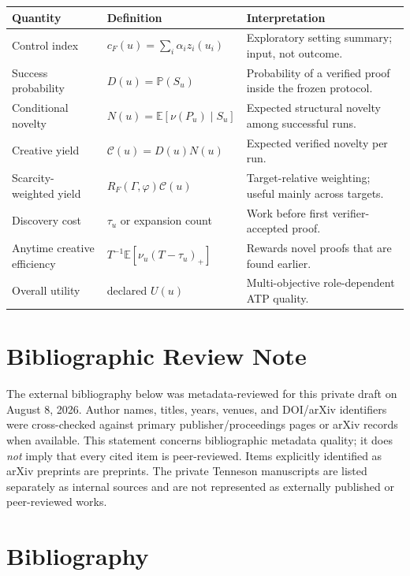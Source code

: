 \documentclass[11pt]{article}
\theoremstyle{datatheorem}
\theoremstyle{definition}
\newcommand{\E}{\mathbb{E}}
\newcommand{\Prb}{\mathbb{P}}
\newcommand{\cY}{\mathcal{C}}
\begin{document}
\begin{longtable}{@{}p{}p{}p{}@{}}
\toprule
Quantity & Definition & Interpretation\\
\midrule
\endhead
Control index & $c_F(u)=\sum_i\alpha_i z_i(u_i)$ & Exploratory setting summary; input, not outcome.\\
Success probability & $D(u)=\Prb(S_u)$ & Probability of a verified proof inside the frozen protocol.\\
Conditional novelty & $N(u)=\E[\nu(P_u)\mid S_u]$ & Expected structural novelty among successful runs.\\
Creative yield & $\cY(u)=D(u)N(u)$ & Expected verified novelty per run.\\
Scarcity-weighted yield & $R_F(\Gamma,\varphi)\cY(u)$ & Target-relative weighting; useful mainly across targets.\\
Discovery cost & $\tau_u$ or expansion count & Work before first verifier-accepted proof.\\
Anytime creative efficiency & $T^{-1}\E[\nu_u(T-\tau_u)_+]$ & Rewards novel proofs that are found earlier.\\
Overall utility & declared $U(u)$ & Multi-objective role-dependent ATP quality.\\
\bottomrule
\end{longtable}

\section{Bibliographic Review Note}

The external bibliography below was metadata-reviewed for this private draft on August 8, 2026. Author names, titles, years, venues, and DOI/arXiv identifiers were cross-checked against primary publisher/proceedings pages or arXiv records when available. This statement concerns bibliographic metadata quality; it does \emph{not} imply that every cited item is peer-reviewed. Items explicitly identified as arXiv preprints are preprints. The private Tenneson manuscripts are listed separately as internal sources and are not represented as externally published or peer-reviewed works.

\section*{Bibliography}
\end{document}

